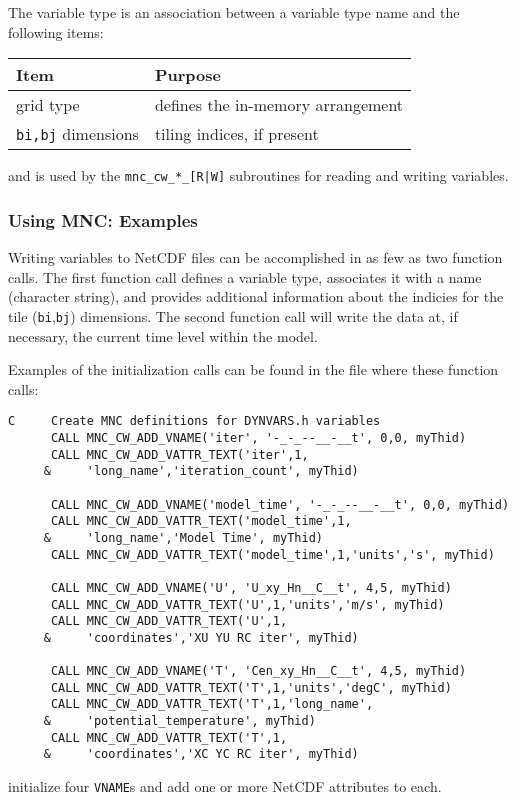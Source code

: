The variable type is an association between a variable type name and the
following items:
\begin{center}
  \begin{tabular}[h]{|l|l|}\hline
    \textbf{Item}  & \textbf{Purpose}  \\\hline
    grid type  &  defines the in-memory arrangement  \\
    \texttt{bi,bj} dimensions  &  tiling indices, if present  \\\hline
  \end{tabular}
\end{center}
and is used by the \texttt{mnc\_cw\_*\_[R|W]} subroutines for reading
and writing variables.


\subsubsection{Using MNC: Examples}

Writing variables to NetCDF files can be accomplished in as few as two
function calls.  The first function call defines a variable type,
associates it with a name (character string), and provides additional
information about the indicies for the tile (\texttt{bi},\texttt{bj})
dimensions.  The second function call will write the data at, if
necessary, the current time level within the model.

Examples of the initialization calls can be found in the file 
where these function calls:
{\footnotesize
\begin{verbatim}
C     Create MNC definitions for DYNVARS.h variables
      CALL MNC_CW_ADD_VNAME('iter', '-_-_--__-__t', 0,0, myThid)
      CALL MNC_CW_ADD_VATTR_TEXT('iter',1,
     &     'long_name','iteration_count', myThid)

      CALL MNC_CW_ADD_VNAME('model_time', '-_-_--__-__t', 0,0, myThid)
      CALL MNC_CW_ADD_VATTR_TEXT('model_time',1,
     &     'long_name','Model Time', myThid)
      CALL MNC_CW_ADD_VATTR_TEXT('model_time',1,'units','s', myThid)

      CALL MNC_CW_ADD_VNAME('U', 'U_xy_Hn__C__t', 4,5, myThid)
      CALL MNC_CW_ADD_VATTR_TEXT('U',1,'units','m/s', myThid)
      CALL MNC_CW_ADD_VATTR_TEXT('U',1,
     &     'coordinates','XU YU RC iter', myThid)

      CALL MNC_CW_ADD_VNAME('T', 'Cen_xy_Hn__C__t', 4,5, myThid)
      CALL MNC_CW_ADD_VATTR_TEXT('T',1,'units','degC', myThid)
      CALL MNC_CW_ADD_VATTR_TEXT('T',1,'long_name',
     &     'potential_temperature', myThid)
      CALL MNC_CW_ADD_VATTR_TEXT('T',1,
     &     'coordinates','XC YC RC iter', myThid)
\end{verbatim}
}
{\noindent initialize four \texttt{VNAME}s and add one or more NetCDF
  attributes to each.}
    
